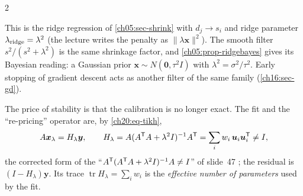 \begin{paracol}{2}
\begin{intuition}
This is the ridge regression of \cref{ch05:sec-shrink} with $d_j\to s_i$ and ridge parameter $\lambda_{\rm ridge}=\lambda^2$ (the lecture writes the penalty as $\|\lambda\bm x\|^2$). The smooth filter $s^2/(s^2+\lambda^2)$ is the same shrinkage factor,
and \cref{ch05:prop-ridgebayes} gives its Bayesian reading: a Gaussian prior $\bm x\sim N(\bm 0,\tau^2I)$ with $\lambda^2=\sigma^2/\tau^2$. Early stopping of gradient descent acts as another filter of the same family (\cref{ch16:sec-gd}).
\end{intuition}

The price of stability is that the calibration is no longer exact. The fit and the ``re-pricing'' operator are, by \eqref{ch20:eq-tikh},
\begin{equation}\label{ch20:eq-influence}
  A\bm x_\lambda=H_\lambda\bm y,\qquad H_\lambda=A(A^{\mathsf T} A+\lambda^2I)^{-1}A^{\mathsf T}=\sum_iw_i\,\bm u_i\bm u_i^{\mathsf T}\ne I,
\end{equation}
the corrected form of the ``$A^{\mathsf T}(A^{\mathsf T} A+\lambda^2I)^{-1}A\neq I$'' of slide~47 ; the residual is $(I-H_\lambda)\bm y$. Its trace $\operatorname{tr}H_\lambda=\sum_iw_i$ is the \emph{effective number of parameters} used by the fit.


\end{paracol}
